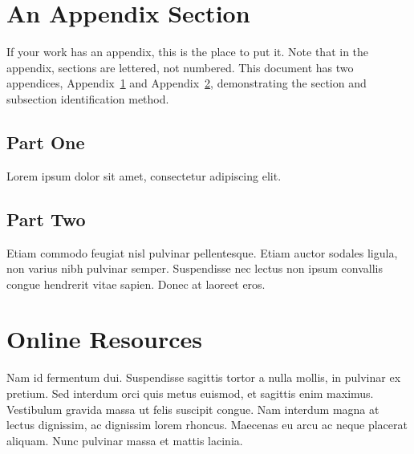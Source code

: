 \documentclass[sigconf,anonymous,review]{acmart}
\begin{document}
\section{An Appendix Section}
\label{appendix:first}
If your work has an appendix, this is the place to put it. Note that in the
appendix, sections are lettered, not numbered. This document has two appendices,
Appendix~\ref{appendix:first} and Appendix~\ref{appendix:second}, demonstrating
the section and subsection identification method.

\subsection{Part One}

Lorem ipsum dolor sit amet, consectetur adipiscing elit.

\subsection{Part Two}

Etiam commodo feugiat nisl pulvinar pellentesque. Etiam auctor sodales ligula,
non varius nibh pulvinar semper. Suspendisse nec lectus non ipsum convallis
congue hendrerit vitae sapien. Donec at laoreet eros.

\section{Online Resources}
\label{appendix:second}
Nam id fermentum dui. Suspendisse sagittis tortor a nulla mollis, in pulvinar ex
pretium. Sed interdum orci quis metus euismod, et sagittis enim maximus.
Vestibulum gravida massa ut felis suscipit congue. Nam interdum magna at lectus
dignissim, ac dignissim lorem rhoncus. Maecenas eu arcu ac neque placerat
aliquam. Nunc pulvinar massa et mattis lacinia.
\end{document}
